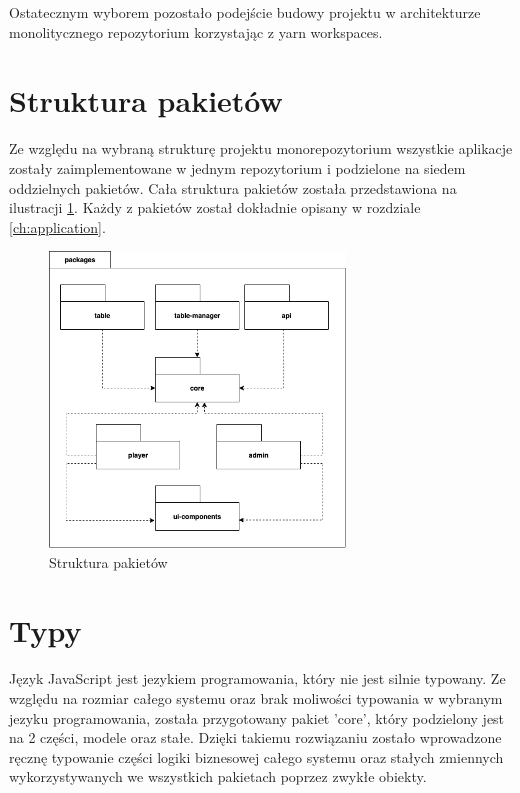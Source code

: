 Ostatecznym wyborem pozostało podejście budowy projektu w architekturze monolitycznego repozytorium korzystając z yarn workspaces.

\newpage

\section{Struktura pakietów}
Ze względu na wybraną strukturę projektu monorepozytorium wszystkie aplikacje zostały zaimplementowane w jednym repozytorium i podzielone na siedem oddzielnych pakietów. Cała struktura pakietów została przedstawiona na ilustracji \ref{fig:packages-structure}. Każdy z pakietów został dokładnie opisany w rozdziale \ref{ch:application}.

\begin{figure}[h!]
  \centering
    \includegraphics[width=0.7\textwidth]{images/diagrams/packages_structure.png}
  \caption{Struktura pakietów}
  \label{fig:packages-structure}
\end{figure}


\section{Typy}
Język JavaScript jest jezykiem programowania, który nie jest silnie typowany. Ze względu na rozmiar całego systemu oraz brak moliwości typowania w wybranym jezyku programowania, została przygotowany pakiet 'core', który podzielony jest na 2 części, modele oraz stałe.
Dzięki takiemu rozwiązaniu zostało wprowadzone ręcznę typowanie części logiki biznesowej całego systemu oraz stałych zmiennych wykorzystywanych we wszystkich pakietach poprzez zwykłe obiekty. 

